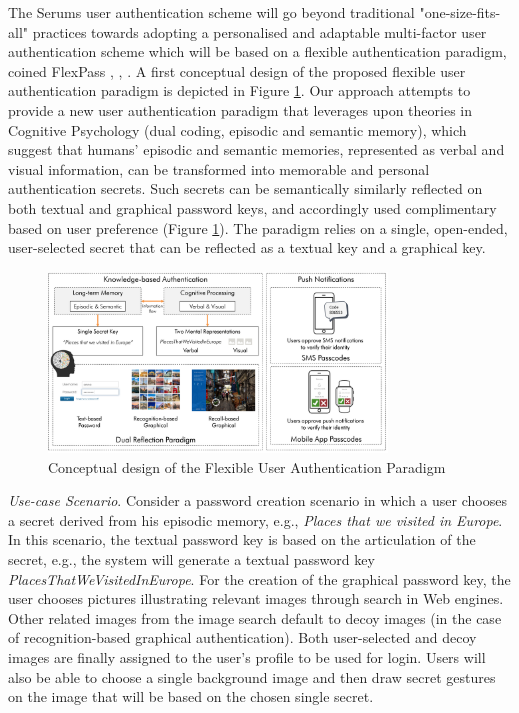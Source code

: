 The Serums user authentication scheme will go beyond traditional "one-size-fits-all" practices towards adopting a personalised and adaptable multi-factor user authentication scheme which will be based on a flexible authentication paradigm, coined FlexPass \cite{belk}, \cite{constantinides}, \cite{hadjidemetriou}. A first conceptual design of the proposed flexible user authentication paradigm is depicted in Figure \ref{fig:flexpass}. Our approach attempts to provide a new user authentication paradigm that leverages upon theories in Cognitive Psychology (dual coding, episodic and semantic memory), which suggest that humans' episodic and semantic memories, represented as verbal and visual information, can be transformed into memorable and personal authentication secrets. Such secrets can be semantically similarly reflected on both textual and graphical password keys, and accordingly used complimentary based on user preference (Figure \ref{fig:flexpass}). The paradigm relies on a single, open-ended, user-selected secret that can be reflected as a textual key and a graphical key. 

\begin{figure}[H]
    \centering
    \includegraphics[width=90mm]{images/flexpass.png}
    \caption{Conceptual design of the Flexible User Authentication Paradigm}
    \label{fig:flexpass}
\end{figure}

\textit{Use-case Scenario}. Consider a password creation scenario in which a user chooses a secret derived from his episodic memory, e.g., \textit{Places that we visited in Europe}. In this scenario, the textual password key is based on the articulation of the secret, e.g., the system will generate a textual password key \textit{PlacesThatWeVisitedInEurope}. For the creation of the graphical password key, the user chooses pictures illustrating relevant images through search in Web engines. Other related images from the image search default to decoy images (in the case of recognition-based graphical authentication). Both user-selected and decoy images are finally assigned to the user’s profile to be used for login. Users will also be able to choose a single background image and then draw secret gestures on the image that will be based on the chosen single secret.

